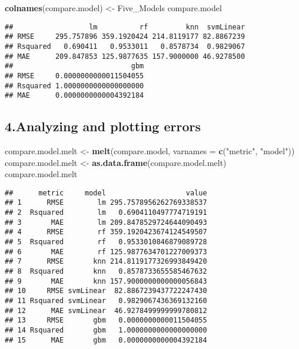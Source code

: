 \documentclass[]{article}
\newenvironment{Shaded}{\begin{snugshade}}{\end{snugshade}}
\newcommand{\DataTypeTok}[1]{\textcolor[rgb]{0.13,0.29,0.53}{#1}}
\newcommand{\KeywordTok}[1]{\textcolor[rgb]{0.13,0.29,0.53}{\textbf{#1}}}
\newcommand{\NormalTok}[1]{#1}
\newcommand{\StringTok}[1]{\textcolor[rgb]{0.31,0.60,0.02}{#1}}
\begin{document}
\begin{Shaded}
\begin{Highlighting}[]
\KeywordTok{colnames}\NormalTok{(compare.model) <-}\StringTok{ }\NormalTok{Five_Models}
\NormalTok{compare.model}
\end{Highlighting}
\end{Shaded}

\begin{verbatim}
##                  lm          rf         knn  svmLinear
## RMSE     295.757896 359.1920424 214.8119177 82.8867239
## Rsquared   0.690411   0.9533011   0.8578734  0.9829067
## MAE      209.847853 125.9877635 157.9000000 46.9278500
##                            gbm
## RMSE     0.0000000000011504055
## Rsquared 1.0000000000000000000
## MAE      0.0000000000004392184
\end{verbatim}

\hypertarget{analyzing-and-plotting-errors}{%
\subsection{4.Analyzing and plotting
errors}\label{analyzing-and-plotting-errors}}

\begin{Shaded}
\begin{Highlighting}[]
\NormalTok{compare.model.melt <-}\StringTok{ }\KeywordTok{melt}\NormalTok{(compare.model, }\DataTypeTok{varnames =} \KeywordTok{c}\NormalTok{(}\StringTok{"metric"}\NormalTok{, }\StringTok{"model"}\NormalTok{))}
\NormalTok{compare.model.melt <-}\StringTok{ }\KeywordTok{as.data.frame}\NormalTok{(compare.model.melt)}
\NormalTok{compare.model.melt}
\end{Highlighting}
\end{Shaded}

\begin{verbatim}
##      metric     model                   value
## 1      RMSE        lm 295.7578956262769338537
## 2  Rsquared        lm   0.6904110497774719191
## 3       MAE        lm 209.8478529724644090493
## 4      RMSE        rf 359.1920423674124549507
## 5  Rsquared        rf   0.9533010846879089728
## 6       MAE        rf 125.9877634701227009373
## 7      RMSE       knn 214.8119177326993849420
## 8  Rsquared       knn   0.8578733655585467632
## 9       MAE       knn 157.9000000000000056843
## 10     RMSE svmLinear  82.8867239437722247430
## 11 Rsquared svmLinear   0.9829067436369132160
## 12      MAE svmLinear  46.9278499999999780812
## 13     RMSE       gbm   0.0000000000011504055
## 14 Rsquared       gbm   1.0000000000000000000
## 15      MAE       gbm   0.0000000000004392184
\end{verbatim}
\end{document}
